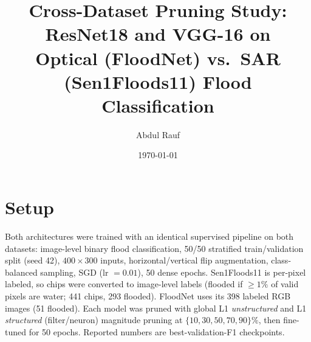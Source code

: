 \documentclass[11pt]{article}
\title{Cross-Dataset Pruning Study: ResNet18 and VGG-16 on\\
Optical (FloodNet) vs.\ SAR (Sen1Floods11) Flood Classification}
\author{Abdul Rauf}
\date{\today}
\begin{document}
\maketitle

\section*{Setup}
Both architectures were trained with an identical supervised pipeline on
both datasets: image-level binary flood classification, 50/50 stratified
train/validation split (seed 42), $400\times300$ inputs,
horizontal/vertical flip augmentation, class-balanced sampling, SGD
(lr $=0.01$), 50 dense epochs. Sen1Floods11 is per-pixel labeled, so
chips were converted to image-level labels (flooded if $\geq 1\%$ of
valid pixels are water; 441 chips, 293 flooded). FloodNet uses its 398
labeled RGB images (51 flooded). Each model was pruned with global L1
\emph{unstructured} and L1 \emph{structured} (filter/neuron) magnitude
pruning at $\{10,30,50,70,90\}\%$, then fine-tuned for 50 epochs.
Reported numbers are best-validation-F1 checkpoints.
\end{document}
